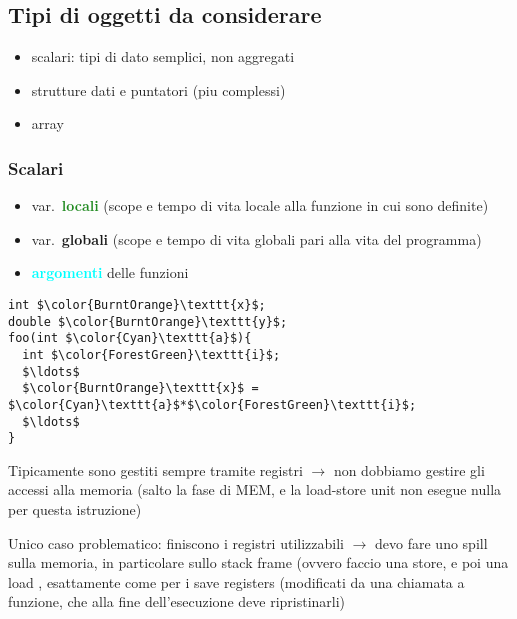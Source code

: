 \subsection{Tipi di oggetti da considerare}

\begin{itemize}
  \item scalari: tipi di dato semplici, non aggregati
  \item strutture dati e puntatori (piu complessi)
  \item array
\end{itemize}

\subsubsection{Scalari}

\noindent\begin{minipage}[c]{.6\textwidth}
\begin{itemize}
  \item var.~\textcolor{ForestGreen}{\textbf{locali}} (scope e tempo di vita locale alla funzione in cui sono definite)
  \item var.~\textcolor{BurntOrange}{\textbf{globali}} (scope e tempo di vita globali pari alla vita del programma)
  \item \textcolor{Cyan}{\textbf{argomenti}} delle funzioni
\end{itemize}
\end{minipage}\hfill
\begin{minipage}[c]{.3\textwidth}
\begin{lstlisting}
int $\color{BurntOrange}\texttt{x}$;
double $\color{BurntOrange}\texttt{y}$;
foo(int $\color{Cyan}\texttt{a}$){
  int $\color{ForestGreen}\texttt{i}$;
  $\ldots$
  $\color{BurntOrange}\texttt{x}$ = $\color{Cyan}\texttt{a}$*$\color{ForestGreen}\texttt{i}$;
  $\ldots$
}\end{lstlisting}
\end{minipage}


Tipicamente sono gestiti sempre tramite registri $\rightarrow$ non dobbiamo gestire gli accessi alla memoria (salto la fase di MEM, e la load-store unit non esegue nulla per questa istruzione)

\begin{emphasize}
  Unico caso problematico: finiscono i registri utilizzabili $\rightarrow$ devo fare uno spill sulla memoria, in particolare sullo stack frame (ovvero faccio una store, e poi una load , esattamente come per i save registers (modificati da una chiamata a funzione, che alla fine dell'esecuzione deve ripristinarli)
\end{emphasize}

